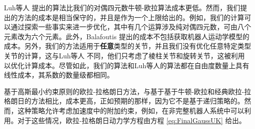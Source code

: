 Luh等人 \cite{Luh1980} 提出的算法比我们的对偶四元数牛顿-欧拉算法成本更低。然而，我们提出的方法的成本是相当保守的，并且是作为一个上限给出的。例如，我们的计算可以通过探索一些事实来进一步优化，其中有几个运算涉及纯对偶四元数，可由八个元素改为六个元素。此外，Balafoutis \cite{Balafoutis1994} 提出的成本不包括获取机器人运动学模型的成本。另外，我们的方法适用于\textbf{任意}类型的关节，并且我们没有优化任意特定类型关节的计算，这与Luh等人 \cite{Luh1980} 不同，他们只考虑了棱柱关节和旋转关节，这被利用以优化计算成本。尽管如此，我们的算法和Luh等人的算法都在自由度数量上具有线性成本，其系数的数量级都相同。

基于高斯最小约束原则的欧拉-拉格朗日方法，与基于基于牛顿-欧拉和经典欧拉-拉格朗日的方法相比，成本更高，正如预期的那样，因为它不是基于递归策略的。然而，这种策略允许考虑加速度中的附加约束，例如，在非完整机器人系统中可以利用。对于这些情况，欧拉-拉格朗日动力学方程由方程  \eqref{eq:FinalGaussUK} 给出。
